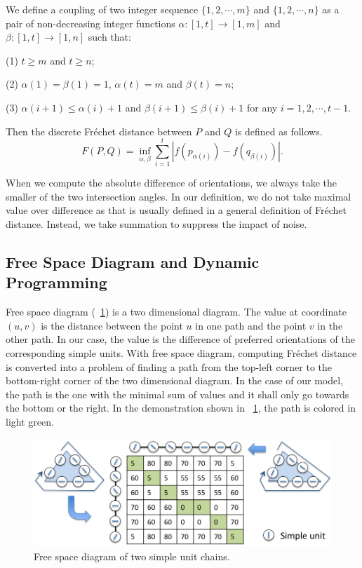\documentclass[10pt,letterpaper]{article}
\begin{document}
We define a coupling of two integer sequence $\{1,2,\cdots,m\}$ and $\{1,2,\cdots,n\}$
as a pair of non-decreasing integer functions $\alpha:[1,t]\rightarrow[1,m]$ and $\beta:[1,t]\rightarrow[1,n]$
such that:

(1) $t\ge m$ and $t\ge n$;

(2) $\alpha(1) = \beta(1) = 1$, $\alpha(t) = m$ and $\beta(t) = n$;

(3) $\alpha(i+1)\le\alpha(i)+1$ and $\beta(i+1)\le\beta(i)+1$ for any $i=1,2,\cdots,t-1$.

Then the discrete Fr\'echet distance between $P$ and $Q$ is defined as follows.
\begin{equation}\label{equ:4}
F(P,Q)=\inf_{\alpha,\beta}\sum_{i=1}^{t}|f(p_{\alpha(i)})-f(q_{\beta(i)})|.
\end{equation}

When we compute the absolute difference of orientations,
we always take the smaller of the two intersection angles.
In our definition, we do not take maximal value over difference
as that is usually defined in a general definition of Fr\'echet distance.
Instead, we take summation to suppress the impact of noise.

\subsection{Free Space Diagram and Dynamic Programming}

Free space diagram (\figurename~\ref{fig:8}) is a two dimensional diagram.
The value at coordinate $(u,v)$ is the distance between the point $u$ in one path
and the point $v$ in the other path.
In our case, the value is the difference of preferred orientations of the corresponding simple units.
With free space diagram, computing Fr\'echet distance is converted into a problem of
finding a path from the top-left corner to the bottom-right corner of the two dimensional diagram.
In the case of our model, the path is the one with the minimal sum of values
and it shall only go towards the bottom or the right.
In the demonstration shown in \figurename~\ref{fig:8}, the path is colored in light green.

\begin{figure}[ht]
\begin{center}
\includegraphics[width=0.95\linewidth]{images/fig8.png}
\end{center}
\caption{Free space diagram of two simple unit chains.} 
\label{fig:8}
\end{figure}
\end{document}
